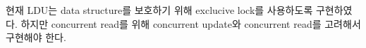 \ifkor
현재 LDU는 data structure를 보호하기 위해 exclucive lock를 사용하도록 구현하였다. 
하지만 concurrent read를 위해 concurrent update와 concurrent read를 고려해서 구현해야 한다.
\else
\fi












